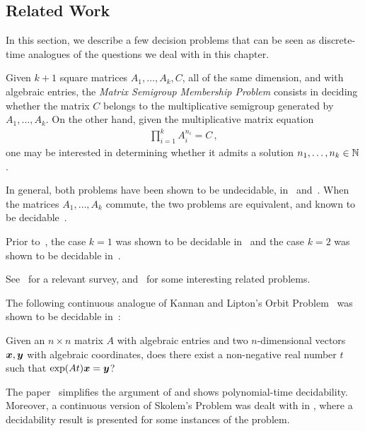 \subsection{Related Work}
\label{sec:lics_related_work}

In this section, we describe a few decision problems that can be seen as discrete-time analogues of the questions we deal with in this chapter.

Given $k+1$ square matrices $A_{1}, \ldots, A_{k}, C$, all of the same dimension, and with algebraic entries, the \emph{Matrix Semigroup Membership Problem} consists in deciding whether the matrix $C$ belongs to the multiplicative semigroup generated by $A_{1}, \ldots, A_{k}$.
On the other hand, given the multiplicative matrix equation
\begin{align*}
\prod\limits_{i=1}^{k} A_{i}^{n_{i}} = C \, ,
\end{align*}
one may be interested in determining whether it admits a solution $n_{1}, \ldots, n_{k} \in \mathbb{N}$.

In general, both problems have been shown to be undecidable, in~\cite{Paterson} and~\cite{MEHTP}.
When the matrices $A_{1}, \ldots, A_{k}$ commute, the two problems are
equivalent, and known to be decidable~\cite{MultiplicativeMatrixEquations}.

Prior to~\cite{MultiplicativeMatrixEquations}, the case $k=1$ was shown to be decidable in~\cite{KL86} and the case $k=2$ was shown to be decidable in~\cite{ABC}.

See~\cite{HalavaSurvey} for a relevant survey, and~\cite{CK05} for
some interesting related problems.

The following continuous analogue of Kannan and Lipton's Orbit
Problem~\cite{KL86} was shown to be decidable in~\cite{Hainry08}:

\begin{definition}
Given an $n \times n$ matrix $A$ with algebraic entries and two
$n$-dimensional vectors $\boldsymbol{x}, \boldsymbol{y}$ with
algebraic coordinates, does there exist a non-negative real number $t$ such
that $\exp(At) \boldsymbol{x} = \boldsymbol{y}$?
\end{definition}

The paper~\cite{ContinuousOrbitIPL} simplifies the argument of
\cite{Hainry08} and shows polynomial-time decidability. Moreover, a
continuous version of Skolem's Problem was dealt with in
\cite{ContinuousSkolem}, where a decidability result is presented for
some instances of the problem.


